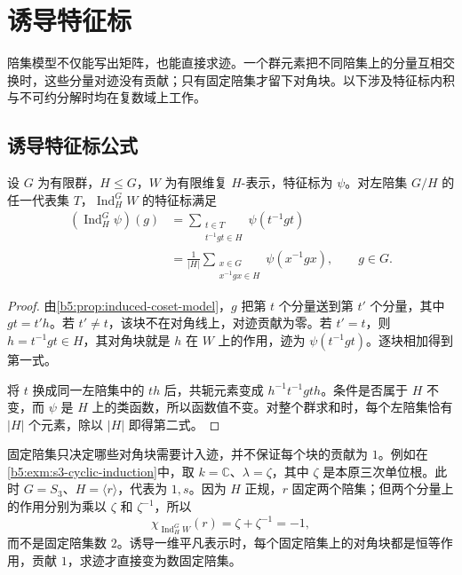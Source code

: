 ﻿%


\section{诱导特征标}
\label{b5:sec:0303}

陪集模型不仅能写出矩阵，也能直接求迹。一个群元素把不同陪集上的分量互相交换时，这些分量对迹没有贡献；只有固定陪集才留下对角块。以下涉及特征标内积与不可约分解时均在复数域上工作。

\subsection{诱导特征标公式}
\label{b5:subsec:0303:01}

\begin{theorem}[诱导特征标公式]\label{b5:thm:induced-character}
	设 \(G\) 为有限群，\(H\le G\)，\(W\) 为有限维复 \(H\)-表示，特征标为 \(\psi\)。对左陪集 \(G/H\) 的任一代表集 \(T\)，\(\operatorname{Ind}_H^G W\) 的特征标满足
	\begin{align}
		(\operatorname{Ind}_H^G\psi)(g) &=\sum_{\substack{t\in T\\t^{-1}gt\in H}}\psi(t^{-1}gt)
		\label{b5:eq:induced-character-cosets}\\
		&=\frac1{|H|}\sum_{\substack{x\in G\\x^{-1}gx\in H}}\psi(x^{-1}gx), \qquad g\in G.
		\label{b5:eq:induced-character-all}
	\end{align}
\end{theorem}
\begin{proof}
	由\cref{b5:prop:induced-coset-model}，\(g\) 把第 \(t\) 个分量送到第 \(t'\) 个分量，其中 \(gt=t'h\)。若 \(t'\ne t\)，该块不在对角线上，对迹贡献为零。若 \(t'=t\)，则 \(h=t^{-1}gt\in H\)，其对角块就是 \(h\) 在 \(W\) 上的作用，迹为 \(\psi(t^{-1}gt)\)。逐块相加得到第一式。

	将 \(t\) 换成同一左陪集中的 \(th\) 后，共轭元素变成 \(h^{-1}t^{-1}gth\)。条件是否属于 \(H\) 不变，而 \(\psi\) 是 \(H\) 上的类函数，所以函数值不变。对整个群求和时，每个左陪集恰有 \(|H|\) 个元素，除以 \(|H|\) 即得第二式。
\end{proof}

固定陪集只决定哪些对角块需要计入迹，并不保证每个块的贡献为 \(1\)。例如在\cref{b5:exm:s3-cyclic-induction}中，取 \(k=\mathbb C\)、\(\lambda=\zeta\)，其中 \(\zeta\) 是本原三次单位根。此时 \(G=S_3\)、\(H=\langle r\rangle\)，代表为 \(1,s\)。因为 \(H\) 正规，\(r\) 固定两个陪集；但两个分量上的作用分别为乘以 \(\zeta\) 和 \(\zeta^{-1}\)，所以
\[
	\chi_{\operatorname{Ind}_H^G W}(r)=\zeta+\zeta^{-1}=-1,
\]
而不是固定陪集数 \(2\)。诱导一维平凡表示时，每个固定陪集上的对角块都是恒等作用，贡献 \(1\)，求迹才直接变为数固定陪集。

